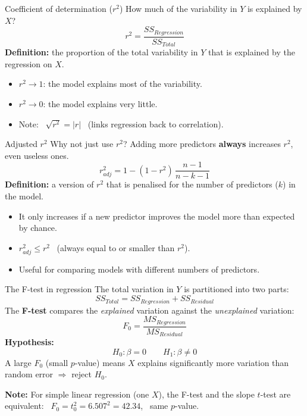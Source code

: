 \documentclass[aspectratio=169]{beamer}
\begin{document}
\begin{frame}{Coefficient of determination ($r^2$)}
How much of the variability in $Y$ is explained by $X$?
\[
r^2 = \frac{SS_{Reg ression}}{SS_{Total}}
\]
\textbf{Definition:} the proportion of the total variability in $Y$ that is explained by the regression on $X$.\\
\vspace{6pt}
\begin{itemize}
  \item $r^2 \to 1$: the model explains most of the variability.
  \item $r^2 \to 0$: the model explains very little.
  \item Note: \ $\sqrt{r^2} = |r|$ \ (links regression back to correlation).
\end{itemize}
\end{frame}

\begin{frame}{Adjusted $r^2$}
Why not just use $r^2$? Adding more predictors \textbf{always} increases $r^2$, even useless ones.
\[
r^2_{adj} = 1 - (1 - r^2)\,\frac{n - 1}{n - k - 1}
\]
\textbf{Definition:} a version of $r^2$ that is penalised for the number of predictors ($k$) in the model.\\
\vspace{6pt}
\begin{itemize}
  \item It only increases if a new predictor improves the model more than expected by chance.
  \item $r^2_{adj} \leq r^2$ \ (always equal to or smaller than $r^2$).
  \item Useful for comparing models with different numbers of predictors.
\end{itemize}
\end{frame}


\begin{frame}{The F-test in regression}
The total variation in $Y$ is partitioned into two parts:
\[
SS_{Total} = SS_{Regression} + SS_{Residual}
\]
The \textbf{F-test} compares the \emph{explained} variation against the \emph{unexplained} variation:
\[
F_0 = \frac{MS_{Regression}}{MS_{Residual}}
\]
\textbf{Hypothesis:}
\[
H_0 : \beta = 0 \qquad H_1 : \beta \neq 0
\]
A large $F_0$ (small $p$-value) means $X$ explains significantly more variation than random error $\Rightarrow$ reject $H_0$.

\vspace{4pt}
\textbf{Note:} For simple linear regression (one $X$), the F-test and the
slope $t$-test are equivalent: \ $F_0 = t_0^2 = 6.507^2 = 42.34$, \ same $p$-value.
\end{frame}
\end{document}

